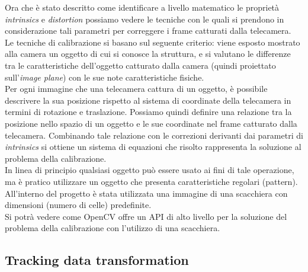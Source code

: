 Ora che è stato descritto come identificare a livello matematico le proprietà \textit{intrinsics} e \textit{distortion} possiamo vedere le tecniche con le quali si prendono in considerazione tali parametri per correggere i frame catturati dalla telecamera.\\
Le tecniche di calibrazione si basano sul seguente criterio: viene esposto mostrato alla camera un oggetto di cui si conosce la struttura, e si valutano le differenze tra le caratteristiche dell'oggetto catturato dalla camera (quindi proiettato sull'\textit{image plane}) con le sue note caratteristiche fisiche. \\Per ogni immagine che una telecamera cattura di un oggetto, è possibile descrivere la sua posizione rispetto al sistema di coordinate della telecamera in termini di rotazione e traslazione. Possiamo quindi definire una relazione tra la posizione nello spazio di un oggetto e le sue coordinate nel frame catturato dalla telecamera. Combinando tale relazione con le correzioni derivanti dai parametri di \textit{intrinsics} si ottiene un sistema di equazioni che risolto rappresenta la soluzione al problema della calibrazione.\\
In linea di principio qualsiasi oggetto può essere usato ai fini di tale operazione, ma è pratico utilizzare un oggetto che presenta caratteristiche regolari (pattern). All'interno del progetto è stata  utilizzata una immagine di una scacchiera con dimensioni (numero di celle) predefinite.  \\
Si potrà vedere come OpenCV offre un API di alto livello per la soluzione del problema della calibrazione con l'utilizzo di una scacchiera.

\subsection{Tracking data transformation}

